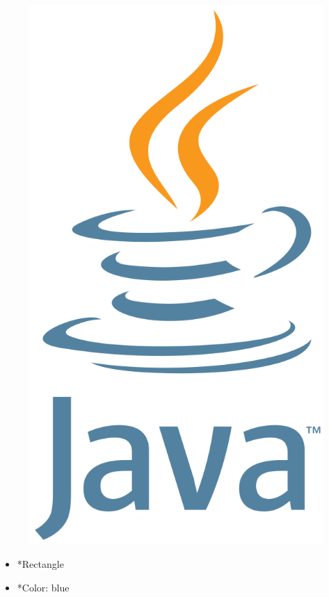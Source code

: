 \documentclass{article}
\begin{document}
\begin{minipage}{0.5\textwidth}
\begin{figure}[H]
\includegraphics{image.png}
\end{figure}
\end{minipage} \hfill
\begin{minipage}{0.45\textwidth}
\begin{itemize}
\item *Rectangle
\item *Color: blue
\end{itemize}
\end{minipage}
\end{document}
